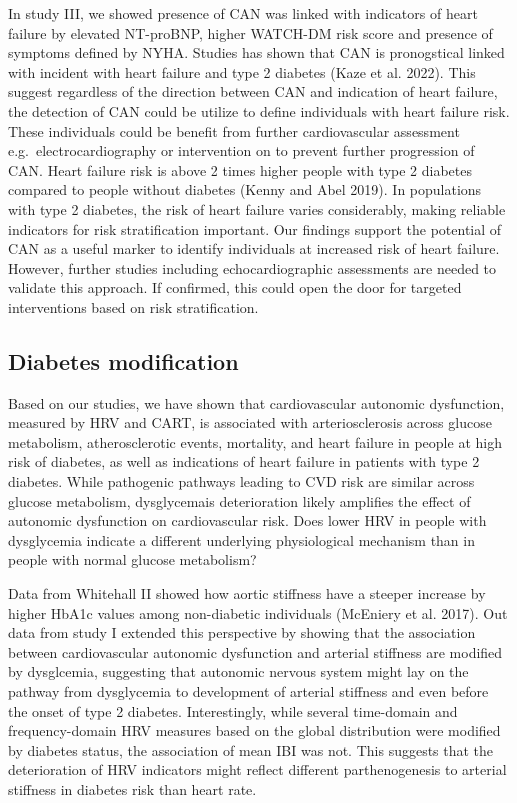 \documentclass[
  a4paper,
  headsepline=true,
  open=any]{scrbook}
\begin{document}
In study III, we showed presence of CAN was linked with indicators of
heart failure by elevated NT-proBNP, higher WATCH-DM risk score and
presence of symptoms defined by NYHA. Studies has shown that CAN is
pronogstical linked with incident with heart failure and type 2 diabetes
(Kaze et al. 2022). This suggest regardless of the direction between CAN
and indication of heart failure, the detection of CAN could be utilize
to define individuals with heart failure risk. These individuals could
be benefit from further cardiovascular assessment
e.g.~electrocardiography or intervention on to prevent further
progression of CAN. Heart failure risk is above 2 times higher people
with type 2 diabetes compared to people without diabetes (Kenny and Abel
2019). In populations with type 2 diabetes, the risk of heart failure
varies considerably, making reliable indicators for risk stratification
important. Our findings support the potential of CAN as a useful marker
to identify individuals at increased risk of heart failure. However,
further studies including echocardiographic assessments are needed to
validate this approach. If confirmed, this could open the door for
targeted interventions based on risk stratification.

\hypertarget{diabetes-modification}{%
\subsection{Diabetes modification}\label{diabetes-modification}}

Based on our studies, we have shown that cardiovascular autonomic
dysfunction, measured by HRV and CART, is associated with
arteriosclerosis across glucose metabolism, atherosclerotic events,
mortality, and heart failure in people at high risk of diabetes, as well
as indications of heart failure in patients with type 2 diabetes. While
pathogenic pathways leading to CVD risk are similar across glucose
metabolism, dysglycemais deterioration likely amplifies the effect of
autonomic dysfunction on cardiovascular risk. Does lower HRV in people
with dysglycemia indicate a different underlying physiological mechanism
than in people with normal glucose metabolism?

Data from Whitehall II showed how aortic stiffness have a steeper
increase by higher HbA1c values among non-diabetic individuals (McEniery
et al. 2017). Out data from study I extended this perspective by showing
that the association between cardiovascular autonomic dysfunction and
arterial stiffness are modified by dysglcemia, suggesting that autonomic
nervous system might lay on the pathway from dysglycemia to development
of arterial stiffness and even before the onset of type 2 diabetes.
Interestingly, while several time-domain and frequency-domain HRV
measures based on the global distribution were modified by diabetes
status, the association of mean IBI was not. This suggests that the
deterioration of HRV indicators might reflect different parthenogenesis
to arterial stiffness in diabetes risk than heart rate.
\end{document}
